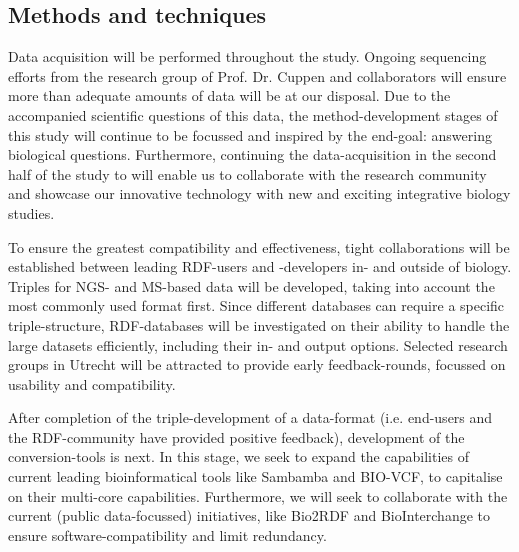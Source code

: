 \documentclass[twoside,fontsize=12pt]{article}
\begin{document}
\subsection*{Methods and techniques} %
Data acquisition will be performed throughout the study. Ongoing sequencing efforts from the research group of Prof. Dr. Cuppen and collaborators will ensure more than adequate amounts of data will be at our disposal. Due to the accompanied scientific questions of this data, the method-development stages of this study will continue to be focussed and inspired by the end-goal: answering biological questions. Furthermore, continuing the data-acquisition in the second half of the study to will enable us to collaborate with the research community and showcase our innovative technology with new and exciting integrative biology studies.
\medskip

\noindent
To ensure the greatest compatibility and effectiveness, tight collaborations will be established between leading RDF-users and -developers in- and outside of biology. Triples for NGS- and MS-based data will be developed, taking into account the most commonly used format first. Since different databases can require a specific triple-structure, RDF-databases will be investigated on their ability to handle the large datasets efficiently, including their in- and output options. Selected research groups in Utrecht will be attracted to provide early feedback-rounds, focussed on usability and compatibility. 

After completion of the triple-development of a data-format (i.e. end-users and the RDF-community have provided positive feedback), development of the conversion-tools is next. In this stage, we seek to expand the capabilities of current leading bioinformatical tools like Sambamba\cite{Tarasov2014} and BIO-VCF\cite{Goto2010}, to capitalise on their multi-core capabilities. Furthermore, we will seek to collaborate with the current (public data-focussed) initiatives, like Bio2RDF\cite{Belleau2008} and BioInterchange\cite{Baran} to ensure software-compatibility and limit redundancy.
\medskip
\end{document}
